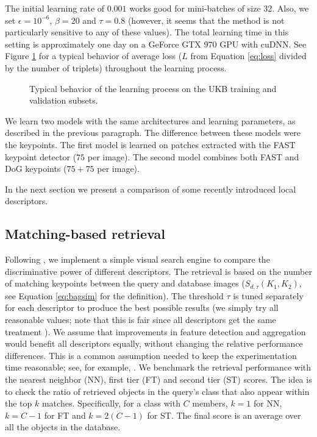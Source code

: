 \documentclass[twocolumn]{article}
\begin{document}
			The initial learning rate of $0.001$ works good for mini-batches of size 32.
			Also, we set $\epsilon=10^{-6}$, $\beta=20$ and $\tau=0.8$
			(however, it seems that the method is not particularly sensitive to any of these values).
			The total learning time in this setting is approximately one day on a GeForce GTX 970 GPU with cuDNN.
			See Figure \ref{fig:trnprogress} for a typical behavior of average loss ($L$ from Equation \eqref{eq:loss} divided by the number of triplets) throughout the learning process.
			\begin{figure}
				\centering
				\resizebox{0.75\columnwidth}{!}
				{
					
				}
				\caption
				{
					Typical behavior of the learning process on the UKB training and validation subsets.
				}
				\label{fig:trnprogress}
			\end{figure}

			We learn two models with the same architectures and learning parameters, as described in the previous paragraph.
			The difference between these models were the keypoints.
			The first model is learned on patches extracted with the FAST keypoint detector ($75$ per image).
			The second model combines both FAST and DoG keypoints ($75+75$ per image).

			In the next section we present a comparison of some recently introduced local descriptors.

		\subsection{Matching-based retrieval}
			Following \cite{rfd}, we implement a simple visual search engine to compare the discriminative power of different descriptors.
			The retrieval  is  based  on  the number of matching keypoints between the query and database images ($S_{d, \tau}(K_1, K_2)$, see Equation \eqref{eq:bagsim} for the definition).
			The threshold $\tau$ is tuned separately for each descriptor to produce the best possible results (we simply try all reasonable values; note that this is fair since all descriptors get the same treatment \cite{rfd}).
			We assume that improvements in feature detection and aggregation would benefit all descriptors equally, without changing the relative performance differences.
			This is a common assumption needed to keep the experimentation time reasonable; see, for example, \cite{kernelconv}.
			We benchmark the retrieval performance with the nearest neighbor (NN), first tier (FT) and second tier (ST) scores.
			The idea is to check the ratio of retrieved objects in the query's class that also appear within the top $k$ matches.
			Specifically, for a class with $C$ members, $k=1$ for NN, $k=C-1$ for FT and $k=2(C-1)$ for ST.
			The final score is an average over all the objects in the database.
\end{document}
